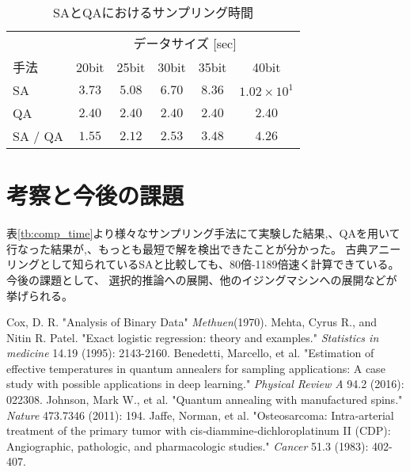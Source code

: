 \documentclass[9pt, twocolumn]{jarticle}
\begin{document}


\begin{table}[hbtp]
	\caption{SAとQAにおけるサンプリング時間}
	\label{tb:sampling_time_SA_QA}
	\centering
	\begin{tabular}{lccccc}
		\hline
		& \multicolumn{5}{c}{データサイズ [sec]}\\
		手法& 20bit & 25bit & 30bit & 35bit & 40bit\\
		\hline\hline
		SA & $3.73$ & $5.08$ & $6.70$ & $8.36$ & $1.02\times 10^{1}$\\
		\hline
		QA & $2.40$ & $2.40$ & $2.40$ & $2.40$ & $2.40$\\
		\hline
		SA / QA & $1.55$ & $2.12$ & $2.53$ & $3.48$ & $4.26$\\
		\hline
	\end{tabular}
\end{table}
	
	
	\section{考察と今後の課題}
	表\ref*{tb:comp_time}より様々なサンプリング手法にて実験した結果,、QAを用いて行なった結果が,、もっとも最短で解を検出できたことが分かった。
	古典アニーリングとして知られているSAと比較しても、80倍-1189倍速く計算できている。
	今後の課題として、 選択的推論への展開、他のイジングマシンへの展開などが挙げられる。
	
	\begin{thebibliography}{9}
		Cox, D. R. "Analysis of Binary Data" \textit{Methuen}(1970).
		Mehta, Cyrus R., and Nitin R. Patel. "Exact logistic regression: theory and examples." \textit{Statistics in medicine} 14.19 (1995): 2143-2160.
		Benedetti, Marcello, et al. "Estimation of effective temperatures in quantum annealers for sampling applications: A case study with possible applications in deep learning." \textit{Physical Review A} 94.2 (2016): 022308.
		Johnson, Mark W., et al. "Quantum annealing with manufactured spins." \textit{Nature} 473.7346 (2011): 194.
		Jaffe, Norman, et al. "Osteosarcoma: Intra‐arterial treatment of the primary tumor with cis‐diammine‐dichloroplatinum II (CDP): Angiographic, pathologic, and pharmacologic studies." \textit{Cancer} 51.3 (1983): 402-407.
	\end{thebibliography}
\end{document}
